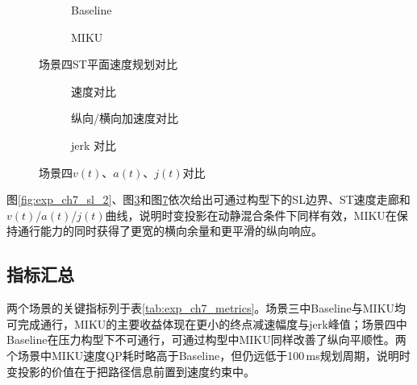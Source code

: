 \begin{figure}[H]
\centering
\begin{subfigure}[b]{0.48\textwidth}
  \centering
  
  \caption{Baseline}
  \label{fig:exp_ch7_st_2:a}
\end{subfigure}\hfill
\begin{subfigure}[b]{0.48\textwidth}
  \centering
  
  \caption{MIKU}
  \label{fig:exp_ch7_st_2:b}
\end{subfigure}
\caption{场景四ST平面速度规划对比}
\label{fig:exp_ch7_st_2}
\end{figure}

\begin{figure}[H]
\centering
\begin{subfigure}[b]{\textwidth}
  \centering
  
  \caption{速度对比}
  \label{fig:exp_ch7_va_2:a}
\end{subfigure}

\begin{subfigure}[b]{\textwidth}
  \centering
  
  \caption{纵向/横向加速度对比}
  \label{fig:exp_ch7_va_2:b}
\end{subfigure}

\begin{subfigure}[b]{\textwidth}
  \centering
  
  \caption{jerk 对比}
  \label{fig:exp_ch7_va_2:c}
\end{subfigure}
\caption{场景四$v(t)$、$a(t)$、$j(t)$对比}
\label{fig:exp_ch7_va_2}
\end{figure}

图\ref{fig:exp_ch7_sl_2}、图\ref{fig:exp_ch7_st_2}和图\ref{fig:exp_ch7_va_2}依次给出可通过构型下的SL边界、ST速度走廊和$v(t)$/$a(t)$/$j(t)$曲线，说明时变投影在动静混合条件下同样有效，MIKU在保持通行能力的同时获得了更宽的横向余量和更平滑的纵向响应。

\subsection{指标汇总}

两个场景的关键指标列于表\ref{tab:exp_ch7_metrics}。场景三中Baseline与MIKU均可完成通行，MIKU的主要收益体现在更小的终点减速幅度与jerk峰值；场景四中Baseline在压力构型下不可通行，可通过构型中MIKU同样改善了纵向平顺性。两个场景中MIKU速度QP耗时略高于Baseline，但仍远低于100\,ms规划周期，说明时变投影的价值在于把路径信息前置到速度约束中。

